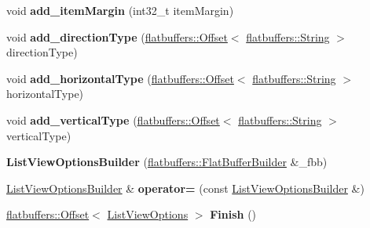 \begin{DoxyCompactItemize}
void {\bfseries add\+\_\+item\+Margin} (int32\+\_\+t item\+Margin)
\item 
\mbox{\label{structflatbuffers_1_1ListViewOptionsBuilder_a1a75addec5180c6668c79134df3ef248}} 
void {\bfseries add\+\_\+direction\+Type} (\hyperlink{structflatbuffers_1_1Offset}{flatbuffers\+::\+Offset}$<$ \hyperlink{structflatbuffers_1_1String}{flatbuffers\+::\+String} $>$ direction\+Type)
\item 
\mbox{\label{structflatbuffers_1_1ListViewOptionsBuilder_a9126dde4157833b204c0325d19a43d54}} 
void {\bfseries add\+\_\+horizontal\+Type} (\hyperlink{structflatbuffers_1_1Offset}{flatbuffers\+::\+Offset}$<$ \hyperlink{structflatbuffers_1_1String}{flatbuffers\+::\+String} $>$ horizontal\+Type)
\item 
\mbox{\label{structflatbuffers_1_1ListViewOptionsBuilder_aa30c98d58d475c003374136d5938abc9}} 
void {\bfseries add\+\_\+vertical\+Type} (\hyperlink{structflatbuffers_1_1Offset}{flatbuffers\+::\+Offset}$<$ \hyperlink{structflatbuffers_1_1String}{flatbuffers\+::\+String} $>$ vertical\+Type)
\item 
\mbox{\label{structflatbuffers_1_1ListViewOptionsBuilder_a01344aad28354e50ff0e35d0e7f3578e}} 
{\bfseries List\+View\+Options\+Builder} (\hyperlink{classflatbuffers_1_1FlatBufferBuilder}{flatbuffers\+::\+Flat\+Buffer\+Builder} \&\+\_\+fbb)
\item 
\mbox{\label{structflatbuffers_1_1ListViewOptionsBuilder_a276c215da906f65dab53ee74c1d89bc5}} 
\hyperlink{structflatbuffers_1_1ListViewOptionsBuilder}{List\+View\+Options\+Builder} \& {\bfseries operator=} (const \hyperlink{structflatbuffers_1_1ListViewOptionsBuilder}{List\+View\+Options\+Builder} \&)
\item 
\mbox{\label{structflatbuffers_1_1ListViewOptionsBuilder_ad870b5935b07587d5e2432839a86df17}} 
\hyperlink{structflatbuffers_1_1Offset}{flatbuffers\+::\+Offset}$<$ \hyperlink{structflatbuffers_1_1ListViewOptions}{List\+View\+Options} $>$ {\bfseries Finish} ()
\item 

\end{DoxyCompactItemize}
